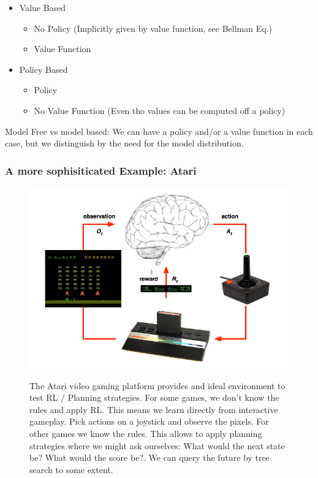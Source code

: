 \documentclass[main]{subfiles}
\begin{document}
\begin{itemize}
    \item Value Based
       \begin{itemize}
            \item No Policy (Implicitly given by value function, see Bellman Eq.)
            \item Value Function
       \end{itemize}
    \item Policy Based
       \begin{itemize}
            \item Policy
            \item No Value Function (Even tho values can be computed off a policy)
       \end{itemize}
\end{itemize}

Model Free vs model based: We can have a policy and/or a value function in each case, but we distinguish by the need for the model distribution.

\subsubsection{A more sophisiticated Example: Atari}

\begin{figure}[H]
	\centering
	\includegraphics[width=0.9\linewidth]{08_ReinforcementLearning/figures/atari.png}
	\label{fig:rl-atari}
	\caption{The Atari video gaming platform provides and ideal environment to test RL / Planning strategies. For some games, we don't know the rules and apply RL. This means we learn directly from interactive gameplay. Pick actions on a joystick and observe the pixels. For other games we know the rules. This allows to apply planning strategies where we might ask ourselves: What would the next state be? What would the score be?. We can query the future by tree search to some extent.}
\end{figure}
\end{document}
